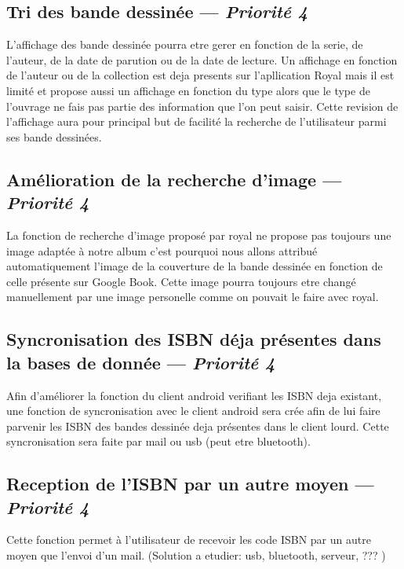 \subsection[Tri des bande dessinée]{Tri des bande dessinée — \emph{Priorité 4}}
L'affichage des bande dessinée pourra etre gerer en fonction de la serie, de l'auteur, de la date de parution ou de la date de lecture. Un affichage en fonction de l'auteur ou de la collection est deja presents sur l'apllication Royal mais il est limité et propose aussi un affichage en fonction du type alors que le type de l'ouvrage ne fais pas partie des information que l'on peut saisir. Cette revision de l'affichage aura pour principal but de facilité la recherche de l'utilisateur parmi ses bande dessinées.

\subsection[Amélioration de la recherche d'image]{Amélioration de la recherche d'image — \emph{Priorité 4}}
La fonction de recherche d'image proposé par royal ne propose pas toujours une image adaptée à notre album c'est pourquoi nous allons attribué automatiquement l'image de la couverture de la bande dessinée en fonction de celle présente sur Google Book. Cette image pourra toujours etre changé manuellement par une image personelle comme on pouvait le faire avec royal.

\subsection[Syncronisation des ISBN déja présentes dans la bases de donnée]{Syncronisation des ISBN déja présentes dans la bases de donnée — \emph{Priorité 4}}
Afin d'améliorer la fonction du client android verifiant les ISBN deja existant, une fonction de syncronisation avec le client android sera crée afin de lui faire parvenir les ISBN des bandes dessinée deja présentes dans le client lourd. Cette syncronisation sera faite par mail ou usb (peut etre bluetooth).

\subsection[Reception de l'ISBN par un autre moyen]{Reception de l'ISBN par un autre moyen — \emph{Priorité 4}}
Cette fonction permet à l'utilisateur de recevoir les code ISBN par un autre moyen que l'envoi d'un mail. (Solution a etudier: usb, bluetooth, serveur, ??? )

